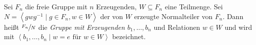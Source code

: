 \begin{definition}[Relation]
	Sei $F_{n}$ die freie Gruppe mit $n$ Erzeugenden, $W \subseteq F_{n}$ eine Teilmenge.
	Sei $N = \left< g w g^{-1} \mid g \in F_{n}, w \in W \right>$ der von $W$ erzeugte Normalteiler von $F_{n}$.
	Dann heißt $\sfrac{F_{n}}{N}$ die \emph{Gruppe mit Erzeugenden $b_1,\ldots,b_{n}$} und Relationen $w \in W$ 
	und wird mit $\left< b_1,\ldots,b_{n} \mid w = e \text{ für } w \in W \right>$ bezeichnet.
\end{definition}






























